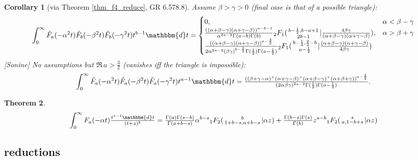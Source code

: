\documentclass[12pt]{article}
\newcommand{\dd}[0] {\mathbbm{d}}
\numberwithin{equation}{section}
\newtheorem{theorem}{Theorem}[section]
\newtheorem{corollary}[theorem]{Corollary}
\newcommand{\Head}[3] {{}_{#1}{#2}_{#3}}
\newcommand{\ArgS}[3] {( \begin{smallmatrix} #1 \\ #2 \end{smallmatrix} | {#3})}
\newcommand{\HypJ}[2] {F_{#1}(#2)}
\newcommand{\HypJreg}[2] {{\tilde{F}}_{#1}(#2)}
\begin{document}
\begin{corollary}[via Theorem \ref{thm_f4_reduce}, GR 6.578.8]
Assume $\beta > \gamma > 0$ (final case is that of a possible triangle):
\begin{equation*}
\int_{0}^{\infty} \HypJreg{a}{-\alpha^2 t} \HypJreg{b}{-\beta^2 t} \HypJreg{b}{-\gamma^2 t} t^{b-1} \dd t = \begin{cases}
0 \text{,} &\alpha < \beta-\gamma\\
\frac{((\alpha+\beta-\gamma)(\alpha+\gamma-\beta))^{a-b-1}}{\alpha^{2a-2}\Gamma(a-b)\Gamma(b)} \Head{2}{F}{1} \ArgS{b-\frac12,b-a+1}{2b-1}{\tfrac{4\beta\gamma}{(\alpha+\beta-\gamma)(\alpha+\gamma-\beta)}} \text{,} &\alpha > \beta + \gamma\\
\frac{((\alpha+\beta-\gamma)(\alpha+\gamma-\beta))^{a-\frac32}}{2\alpha^{2a-2}(\beta \gamma)^{b-\frac12} \Gamma(\frac12) \Gamma(a-\frac12)} \Head{2}{F}{1} \ArgS{b-\frac12,\frac32-b}{a-\frac12}{\tfrac{(\alpha+\beta-\gamma)(\alpha+\gamma-\beta)}{4\beta\gamma}}
\end{cases}
\end{equation*}
[Sonine] No assumptions but $\Re \, a > \tfrac32$ (vanishes iff the triangle is impossible):
\begin{equation*}
\int_{0}^{\infty} \HypJreg{a}{-\alpha^2 t} \HypJreg{a}{-\beta^2 t} \HypJreg{a}{-\gamma^2 t} t^{a-1} \dd t = 
\tfrac{((\beta+\gamma-\alpha)^+(\alpha+\gamma-\beta)^+(\alpha+\beta-\gamma)^+ (\alpha+\beta+\gamma))^{a-\frac32}}{(2\alpha \beta \gamma)^{2a-2} \Gamma(\frac12) \Gamma(a-\frac12)}\text{.}
\end{equation*}
\end{corollary}

\begin{theorem}
\begin{equation*}
\int_{0}^{\infty} \HypJ{a}{-\alpha t} \tfrac{t^{s-1} \dd t}{(t+z)^b} = \tfrac{\Gamma (a) \Gamma (s-b)}{\Gamma (a+b-s)} \alpha^{b-s} \Head{1}{F}{2}\ArgS{b}{1 + b - s, a + b - s}{ \alpha z} + \tfrac{\Gamma(b-s)\Gamma(s)}{\Gamma(b)} z^{s-b} \Head{1}{F}{2} \ArgS{s}{a, 1 - b + s}{\alpha z}
\end{equation*}
\end{theorem}
\subsection{reductions}
\end{document}
